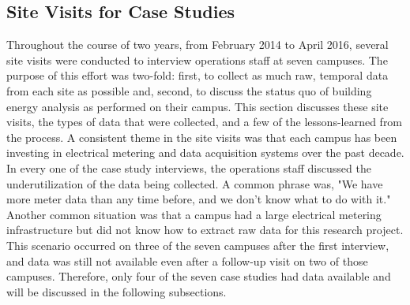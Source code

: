 \subsection{Site Visits for Case Studies}
\label{sec:sitevisit}
Throughout the course of two years, from February 2014 to April 2016, several site visits were conducted to interview operations staff at seven campuses. The purpose of this effort was two-fold: first, to collect as much raw, temporal data from each site as possible and, second, to discuss the status quo of building energy analysis as performed on their campus. This section discusses these site visits, the types of data that were collected, and a few of the lessons-learned from the process. A consistent theme in the site visits was that each campus has been investing in electrical metering and data acquisition systems over the past decade. In every one of the case study interviews, the operations staff discussed the underutilization of the data being collected. A common phrase was, "We have more meter data than any time before, and we don't know what to do with it." Another common situation was that a campus had a large electrical metering infrastructure but did not know how to extract raw data for this research project. This scenario occurred on three of the seven campuses after the first interview, and data was still not available even after a follow-up visit on two of those campuses. Therefore, only four of the seven case studies had data available and will be discussed in the following subsections.

